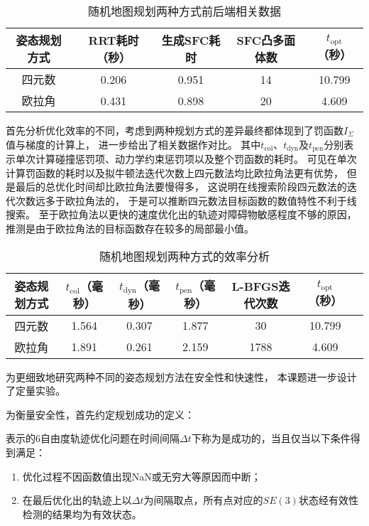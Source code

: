\begin{table}[htbp]
    \caption{随机地图规划两种方式前后端相关数据\label{tab:data_of_2_scenarios_in_random_map}}
    \vspace{0.5em}\centering\wuhao
    \begin{tabular}{ccccc}
    \toprule[1.5pt]
    姿态规划方式 & RRT耗时（秒） & 生成SFC耗时 & SFC凸多面体数 & $t_{\text{opt}}$（秒）\\
    \midrule[1pt]
    四元数 & 0.206 & 0.951 & 14 & 10.799 \\
    欧拉角 & 0.431 & 0.898 & 20 & 4.609 \\
    \bottomrule[1.5pt]
    \end{tabular}
\end{table}

首先分析优化效率的不同，考虑到两种规划方式的差异最终都体现到了罚函数$I_\Sigma$值与梯度的计算上，
进一步给出了相关数据作对比。
其中$t_{\text{col}}$、$t_{\text{dyn}}$及$t_{\text{pen}}$分别表示单次计算碰撞惩罚项、动力学约束惩罚项以及整个罚函数的耗时。
可见在单次计算罚函数的耗时以及拟牛顿法迭代次数上四元数法均比欧拉角法更有优势，
但是最后的总优化时间却比欧拉角法要慢得多，
这说明在线搜索阶段四元数法的迭代次数远多于欧拉角法的，
于是可以推断四元数法目标函数的数值特性不利于线搜索。
至于欧拉角法以更快的速度优化出的轨迹对障碍物敏感程度不够的原因，
推测是由于欧拉角法的目标函数存在较多的局部最小值。

\begin{table}[htbp]
    \caption{随机地图规划两种方式的效率分析\label{tab:analysis_of_efficiency_in_random_map_scenario}}
    \vspace{0.5em}\centering\wuhao
    \begin{tabular}{ccccccc}
    \toprule[1.5pt]
    姿态规划方式 & $t_{\text{col}}$（毫秒） & $t_{\text{dyn}}$（毫秒）& $t_{\text{pen}}$（毫秒）& L-BFGS迭代次数 & $t_{\text{opt}}$（秒）\\
    \midrule[1pt]
    四元数 & 1.564 & 0.307 & 1.877 & 30 & 10.799 \\
    欧拉角 & 1.891 & 0.261 & 2.159 & 1788 & 4.609 \\
    \bottomrule[1.5pt]
    \end{tabular}
\end{table}

为更细致地研究两种不同的姿态规划方法在安全性和快速性，
本课题进一步设计了定量实验。

为衡量安全性，首先约定规划成功的定义：
\begin{definition}
    表示的6自由度轨迹优化问题在时间间隔$\Delta t$下称为是成功的，当且仅当以下条件得到满足：
    \begin{enumerate}
        \renewcommand{\labelenumi}{(\theenumi)}
        \item 优化过程不因函数值出现NaN或无穷大等原因而中断；
        \item 在最后优化出的轨迹上以$\Delta t$为间隔取点，所有点对应的$SE(3)$状态经有效性检测的结果均为有效状态。
    \end{enumerate}
\end{definition}

